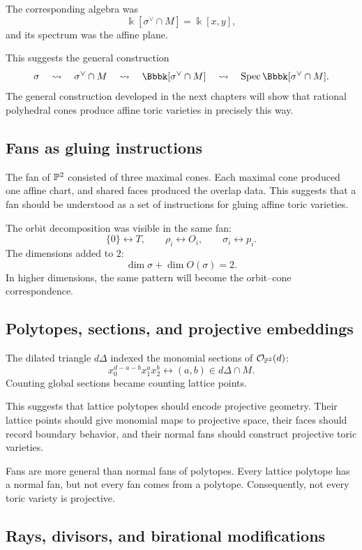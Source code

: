 The corresponding algebra was
\[
\Bbbk[\sigma^\vee\cap M]
=
\Bbbk[x,y],
\]
and its spectrum was the affine plane.

This suggests the general construction
\[
\sigma
\quad\rightsquigarrow\quad
\sigma^\vee\cap M
\quad\rightsquigarrow\quad
\Bbbk[\sigma^\vee\cap M]
\quad\rightsquigarrow\quad
\Spec\Bbbk[\sigma^\vee\cap M].
\]
The general construction developed in the next chapters will show
that rational polyhedral cones produce affine toric varieties in
precisely this way.

\subsection*{Fans as gluing instructions}

The fan of \(\mathbb{P}^2\) consisted of three maximal cones. Each maximal
cone produced one affine chart, and shared faces produced the overlap
data. This suggests that a fan should be understood as a set of
instructions for gluing affine toric varieties.

The orbit decomposition was visible in the same fan:
\[
\{0\}\longleftrightarrow T,\qquad
\rho_i\longleftrightarrow O_i,\qquad
\sigma_i\longleftrightarrow p_i.
\]
The dimensions added to \(2\):
\[
\dim\sigma+\dim O(\sigma)=2.
\]
In higher dimensions, the same pattern will become the
orbit--cone correspondence.

\subsection*{Polytopes, sections, and projective embeddings}

The dilated triangle \(d\Delta\) indexed the monomial sections of
\(\mathcal{O}_{\mathbb{P}^2}(d)\):
\[
x_0^{d-a-b}x_1^ax_2^b
\longleftrightarrow
(a,b)\in d\Delta\cap M.
\]
Counting global sections became counting lattice points.

This suggests that lattice polytopes should encode projective
geometry. Their lattice points should give monomial maps to projective
space, their faces should record boundary behavior, and their normal
fans should construct projective toric varieties.

\begin{warningbox}
Fans are more general than normal fans of polytopes. Every lattice
polytope has a normal fan, but not every fan comes from a polytope.
Consequently, not every toric variety is projective.
\end{warningbox}

\subsection*{Rays, divisors, and birational modifications}

